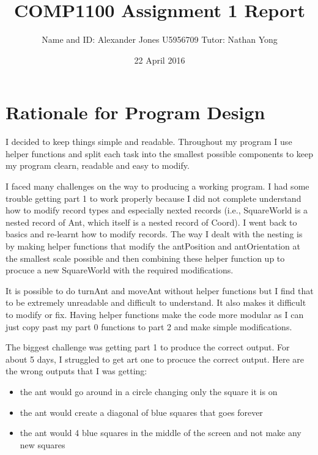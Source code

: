 \documentclass[12pt]{article}
\begin{document}
\title{COMP1100 Assignment 1 Report}
\author{Name and ID: Alexander Jones U5956709 \hfil Tutor: Nathan Yong}
\date{22 April 2016}
\maketitle

\tableofcontents

\section{Rationale for Program Design}

I decided to keep things simple and readable. Throughout my program I use helper functions and split each task into the smallest possible components to keep my program clearn, readable and easy to modify.

I faced many challenges on the way to producing a working program. I had some trouble getting part 1 to work properly because I did not complete understand how to modify record types and especially nexted records (i.e., SquareWorld is a nested record of Ant, which itself is a nested record of Coord). I went back to basics and re-learnt how to modify records. The way I dealt with the nesting is by making helper functions that modify the antPosition and antOrientation at the smallest scale possible and then combining these helper function up to procuce a new SquareWorld with the required modifications.

It is possible to do turnAnt and moveAnt without helper functions but I find that to be extremely unreadable and difficult to understand. It also makes it difficult to modify or fix. Having helper functions make the code more modular as I can just copy past my part 0 functions to part 2 and make simple modifications.

The biggest challenge was getting part 1 to produce the correct output. For about 5 days, I struggled to get art one to procuce the correct output. Here are the wrong outputs that I was getting:

\break

\begin{itemize}
\item the ant would go around in a circle changing only the square it is on
\item the ant would create a diagonal of blue squares that goes forever
\item the ant would 4 blue squares in the middle of the screen and not make any new squares
\end{itemize}
\end{document}
